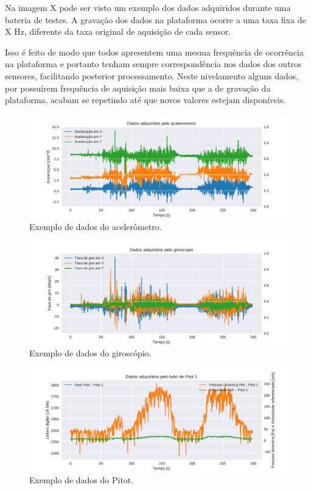 Na imagem X pode ser visto um exemplo dos dados adquiridos durante uma bateria de testes. A gravação dos dados na plataforma ocorre a uma taxa fixa de X Hz, diferente da taxa original de aquisição de cada sensor. 

Isso é feito de modo que todos apresentem uma mesma frequência de ocorrência na plataforma e portanto tenham sempre correspondência nos dados dos outros sensores, facilitando posterior processamento. Neste nivelamento alguns dados, por possuírem frequência de aquisição mais baixa que a de gravação da plataforma, acabam se repetindo até que novos valores estejam disponíveis.

\begin{figure}[!ht]
    \centering
    \includegraphics[width=.8\linewidth]{plots/accel_plots.pdf}
    \caption{Exemplo de dados do acelerômetro\cite{autor}.}
    \label{fig:raw_accel_plots}
\end{figure}

\begin{figure}[!ht]
    \centering
    \includegraphics[width=.8\linewidth]{plots/gyro_plots.pdf}
    \caption{Exemplo de dados do giroscópio\cite{autor}.}
    \label{fig:raw_gyro_plots}
\end{figure}

\begin{figure}[!ht]
    \centering
    \includegraphics[width=.8\linewidth]{plots/pitot_plots.pdf}
    \caption{Exemplo de dados do Pitot\cite{autor}.}
    \label{fig:raw_pitot_plots}
\end{figure}


